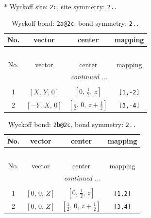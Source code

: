 \documentclass[fleqn,8pt]{jsarticle}
\begin{document}
* Wyckoff site: {\tt 2c}, site symmetry: {\tt 2..}
\renewcommand{\arraystretch}{1.2}
\begin{longtable}{cccc}
\caption{Wyckoff bond: {\tt 2a@2c}, bond symmetry: {\tt 2..}}
 \\
 \hline \hline
No. & vector & center & mapping \\ \hline \endfirsthead

\multicolumn{3}{l}{\tablename\ \thetable{}} \\
 \hline \hline
No. & vector & center & mapping \\ \hline \endhead

 \hline \hline
\multicolumn{3}{r}{\footnotesize\it continued ...} \\ \endfoot

 \hline \hline
\multicolumn{3}{r}{} \\ \endlastfoot

1 & $\left[ X,\, Y,\, 0 \right]$ & $\left[ 0,\, \frac{1}{2},\, z \right]$ & {\tt [1,-2]} \\ \hline
2 & $\left[ - Y,\, X,\, 0 \right]$ & $\left[ \frac{1}{2},\, 0,\, z + \frac{1}{2} \right]$ & {\tt [3,-4]} \\
\end{longtable}
\renewcommand{\arraystretch}{1.2}
\begin{longtable}{cccc}
\caption{Wyckoff bond: {\tt 2b@2c}, bond symmetry: {\tt 2..}}
 \\
 \hline \hline
No. & vector & center & mapping \\ \hline \endfirsthead

\multicolumn{3}{l}{\tablename\ \thetable{}} \\
 \hline \hline
No. & vector & center & mapping \\ \hline \endhead

 \hline \hline
\multicolumn{3}{r}{\footnotesize\it continued ...} \\ \endfoot

 \hline \hline
\multicolumn{3}{r}{} \\ \endlastfoot

1 & $\left[ 0,\, 0,\, Z \right]$ & $\left[ 0,\, \frac{1}{2},\, z \right]$ & {\tt [1,2]} \\ \hline
2 & $\left[ 0,\, 0,\, Z \right]$ & $\left[ \frac{1}{2},\, 0,\, z + \frac{1}{2} \right]$ & {\tt [3,4]} \\
\end{longtable}
\renewcommand{\arraystretch}{1.2}
\end{document}

